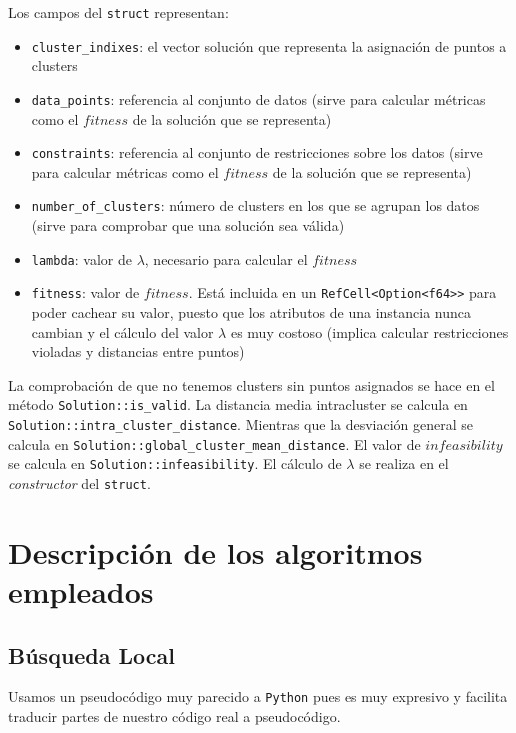 \documentclass[11pt]{article}
\begin{document}
Los campos del \lstinline{struct} representan:

\begin{itemize}
    \item \lstinline{cluster_indixes}: el vector solución que representa la asignación de puntos a clusters
    \item \lstinline{data_points}: referencia al conjunto de datos (sirve para calcular métricas como el $fitness$ de la solución que se representa)
    \item \lstinline{constraints}: referencia al conjunto de restricciones sobre los datos (sirve para calcular métricas como el $fitness$ de la solución que se representa)
    \item \lstinline{number_of_clusters}: número de clusters en los que se agrupan los datos (sirve para comprobar que una solución sea válida)
    \item \lstinline{lambda}: valor de $\lambda$, necesario para calcular el $fitness$
    \item \lstinline{fitness}: valor de $fitness$. Está incluida en un \lstinline{RefCell<Option<f64>>} para poder cachear su valor, puesto que los atributos de una instancia nunca cambian y el cálculo del valor $\lambda$ es muy costoso (implica calcular restricciones violadas y distancias entre puntos)
\end{itemize}

La comprobación de que no tenemos clusters sin puntos asignados se hace en el método \lstinline{Solution::is_valid}. La distancia media intracluster se calcula en \lstinline{Solution::intra_cluster_distance}. Mientras que la desviación general se calcula en \lstinline{Solution::global_cluster_mean_distance}. El valor de $infeasibility$ se calcula en \lstinline{Solution::infeasibility}. El cálculo de $\lambda$ se realiza en el \emph{constructor} del \lstinline{struct}.

\pagebreak

\section{Descripción de los algoritmos empleados}

\subsection{Búsqueda Local}

Usamos un pseudocódigo muy parecido a \lstinline{Python} pues es muy expresivo y facilita traducir partes de nuestro código real a pseudocódigo.
\end{document}
